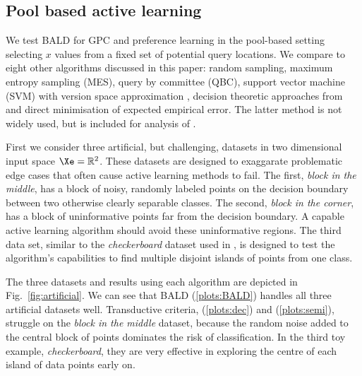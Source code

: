 \subsection{Pool based active learning}

We test BALD for GPC and preference learning in the pool-based setting \ie selecting $x$ values from a fixed set of potential query locations. We compare to eight other algorithms discussed in this paper: random sampling, maximum entropy sampling (MES), query by committee (QBC), support vector machine (SVM) with version space approximation \cite{Tong2002}, decision theoretic approaches from \citep{Kapoor2007, Zhu2003} and direct minimisation of expected empirical error. The latter method is not widely used, but is included for analysis of \cite{Kapoor2007}.

First we consider three artificial, but challenging, datasets in two dimensional input space $\Xe = \mathbb{R}^2$. These datasets are designed to exaggarate problematic edge cases that often cause active learning methods to fail. The first, \emph{block in the middle}, has a block of noisy, randomly labeled points on the decision boundary between two otherwise clearly separable classes. The second, \emph{block in the corner}, has a block of uninformative points far from the decision boundary. A capable active learning algorithm should avoid these uninformative regions. The third data set, similar to the \emph{checkerboard} dataset used in \cite{Zhu2003}, is designed to test the algorithm's capabilities to find multiple disjoint islands of points from one class. 

The three datasets and results using each algorithm are depicted in Fig.\ \ref{fig:artificial}. We can see that BALD (\ref{plots:BALD}) handles all three artificial datasets well. Transductive criteria, \citet{Kapoor2007} (\ref{plots:dec}) and \citet{Zhu2003} (\ref{plots:semi}), struggle on the \emph{block in the middle} dataset, because the random noise added to the central block of points dominates the risk of classification. In the third toy example, \emph{checkerboard}, they are very effective in exploring the centre of each island of data points early on.

